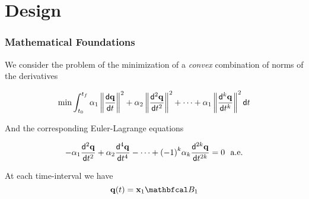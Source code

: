 
\section{Design}
\begin{frame}[t]
	\frametitle{Mathematical Foundations}

	We consider the problem of the minimization of a \emph{convex} combination of norms of the derivatives

	\begin{equation*}
		\min \int_{t_0}^{t_f} \alpha_1 \left\|\frac{\mathsf{d} \mathbf{q}}{\mathsf{d} t}\right\|^2 + \alpha_2 \left\|\frac{\mathsf{d}^{2} \mathbf{q}}{\mathsf{d} t^{2}}\right\|^2 + \cdots  + \alpha_1 \left\|\frac{\mathsf{d}^{k} \mathbf{q}}{\mathsf{d} t^{k}} \right\|^2 \mathsf{d} t
	\end{equation*}

	And the corresponding Euler-Lagrange equations

	\begin{equation*}
		-\alpha_1 \diffk{\qv}{t}{2}+ \alpha_2 \diffk{\qv}{t}{4}- \cdots +  {(-1)}^k \alpha_k \diffk{\qv}{t}{2k}= 0 \ \ \text{a.e.}
	\end{equation*}

	At each time-interval we have
	\begin{equation*}
		\qv(t) = \xv_1 \basis_1
	\end{equation*}
\end{frame}

